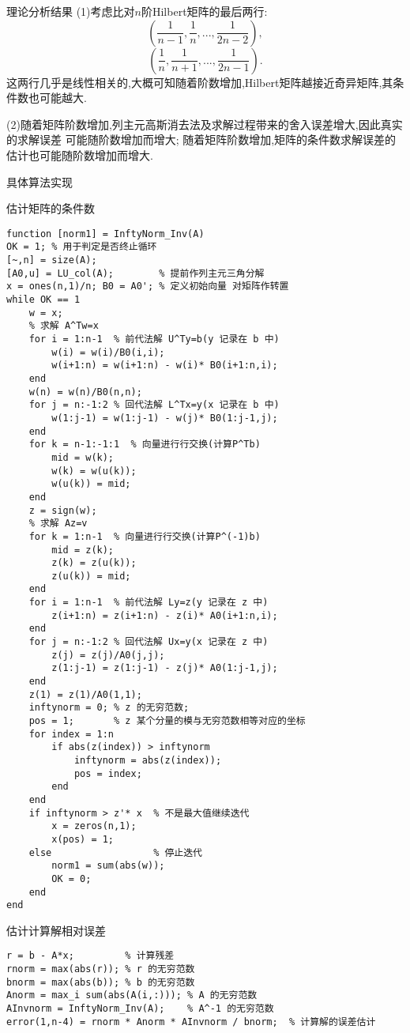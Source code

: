 \documentclass{article}
\begin{document}
\begin{section}{理论分析结果}
    \noindent(1)考虑比对$n$阶Hilbert矩阵的最后两行:
    $$ (\dfrac{1}{n-1},\dfrac{1}{n},...,\dfrac{1}{2n-2}),$$
    $$ (\dfrac{1}{n},\dfrac{1}{n+1},...,\dfrac{1}{2n-1}).$$
    这两行几乎是线性相关的,大概可知随着阶数增加,Hilbert矩阵越接近奇异矩阵,其条件数也可能越大.

    \noindent(2)随着矩阵阶数增加,列主元高斯消去法及求解过程带来的舍入误差增大,因此真实的求解误差
    可能随阶数增加而增大; 随着矩阵阶数增加,矩阵的条件数求解误差的估计也可能随阶数增加而增大.
\end{section}

\begin{section}{具体算法实现}
    \begin{subsection}{估计矩阵的条件数}
        \begin{lstlisting}
function [norm1] = InftyNorm_Inv(A)
OK = 1; % 用于判定是否终止循环
[~,n] = size(A);
[A0,u] = LU_col(A);        % 提前作列主元三角分解
x = ones(n,1)/n; B0 = A0'; % 定义初始向量 对矩阵作转置
while OK == 1 
    w = x;  
    % 求解 A^Tw=x
    for i = 1:n-1  % 前代法解 U^Ty=b(y 记录在 b 中)
        w(i) = w(i)/B0(i,i);
        w(i+1:n) = w(i+1:n) - w(i)* B0(i+1:n,i);
    end
    w(n) = w(n)/B0(n,n);
    for j = n:-1:2 % 回代法解 L^Tx=y(x 记录在 b 中)
        w(1:j-1) = w(1:j-1) - w(j)* B0(1:j-1,j);
    end
    for k = n-1:-1:1  % 向量进行行交换(计算P^Tb)
        mid = w(k);
        w(k) = w(u(k));
        w(u(k)) = mid;
    end
    z = sign(w);
    % 求解 Az=v
    for k = 1:n-1  % 向量进行行交换(计算P^(-1)b)
        mid = z(k);
        z(k) = z(u(k));
        z(u(k)) = mid;
    end
    for i = 1:n-1  % 前代法解 Ly=z(y 记录在 z 中)
        z(i+1:n) = z(i+1:n) - z(i)* A0(i+1:n,i);
    end
    for j = n:-1:2 % 回代法解 Ux=y(x 记录在 z 中)
        z(j) = z(j)/A0(j,j);
        z(1:j-1) = z(1:j-1) - z(j)* A0(1:j-1,j);
    end
    z(1) = z(1)/A0(1,1);
    inftynorm = 0; % z 的无穷范数; 
    pos = 1;       % z 某个分量的模与无穷范数相等对应的坐标
    for index = 1:n
        if abs(z(index)) > inftynorm
            inftynorm = abs(z(index));
            pos = index;
        end
    end
    if inftynorm > z'* x  % 不是最大值继续迭代
        x = zeros(n,1);
        x(pos) = 1;
    else                  % 停止迭代
        norm1 = sum(abs(w));
        OK = 0;
    end
end
        \end{lstlisting}
    \end{subsection}
    \begin{subsection}{估计计算解相对误差}
        \begin{lstlisting}
r = b - A*x;         % 计算残差
rnorm = max(abs(r)); % r 的无穷范数
bnorm = max(abs(b)); % b 的无穷范数
Anorm = max_i sum(abs(A(i,:))); % A 的无穷范数
AInvnorm = InftyNorm_Inv(A);    % A^-1 的无穷范数
error(1,n-4) = rnorm * Anorm * AInvnorm / bnorm;  % 计算解的误差估计
        \end{lstlisting}
    \end{subsection}    
\end{section}
\end{document}
